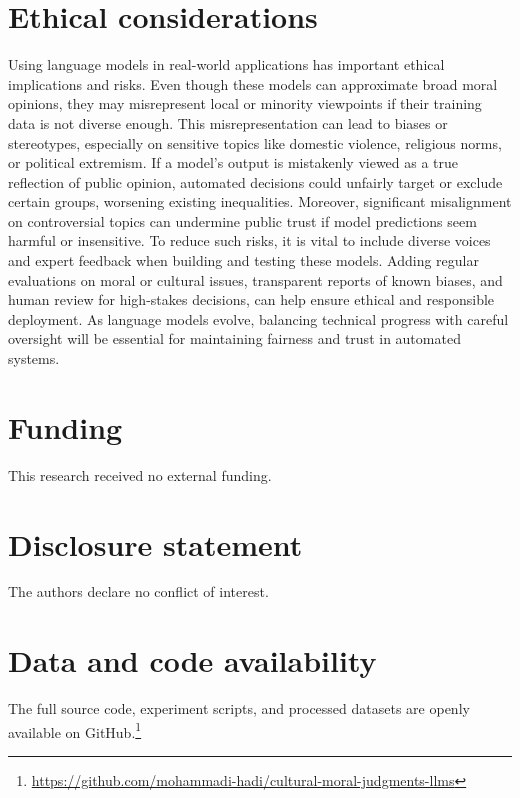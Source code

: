 \documentclass[11pt]{article}
\begin{document}
\section*{Ethical considerations}
\label{sec:impact}

Using language models in real-world applications has important ethical implications and risks. Even though these models can approximate broad moral opinions, they may misrepresent local or minority viewpoints if their training data is not diverse enough. This misrepresentation can lead to biases or stereotypes, especially on sensitive topics like domestic violence, religious norms, or political extremism. If a model’s output is mistakenly viewed as a true reflection of public opinion, automated decisions could unfairly target or exclude certain groups, worsening existing inequalities. Moreover, significant misalignment on controversial topics can undermine public trust if model predictions seem harmful or insensitive. To reduce such risks, it is vital to include diverse voices and expert feedback when building and testing these models. Adding regular evaluations on moral or cultural issues, transparent reports of known biases, and human review for high-stakes decisions, can help ensure ethical and responsible deployment. As language models evolve, balancing technical progress with careful oversight will be essential for maintaining fairness and trust in automated systems.

\section*{Funding}
This research received no external funding.           

\section*{Disclosure statement}
The authors declare no conflict of interest.


\section*{Data and code availability}
The full source code, experiment scripts, and processed datasets are openly available on GitHub.\footnote{\url{https://github.com/mohammadi-hadi/cultural-moral-judgments-llms}}

\end{document}
